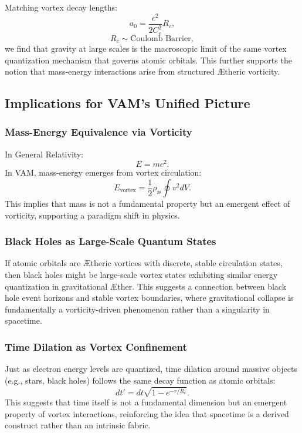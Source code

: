 \documentclass[a4paper,10pt]{article}
\begin{document}
Matching vortex decay lengths:
\begin{equation*}
a_0 = \frac{c^2}{2C_e^2} R_c,
\end{equation*}
\begin{equation*}
R_c \sim \text{Coulomb Barrier},
\end{equation*}
we find that gravity at large scales is the macroscopic limit of the same vortex quantization mechanism that governs atomic orbitals. This further supports the notion that mass-energy interactions arise from structured Ætheric vorticity.


\subsection*{Implications for VAM's Unified Picture}


\subsubsection*{Mass-Energy Equivalence via Vorticity}
In General Relativity:
\begin{equation*}
E = mc^2.
\end{equation*}
In VAM, mass-energy emerges from vortex circulation:
\begin{equation*}
E_\text{vortex} = \frac{1}{2} \rho_\text{\ae} \oint v^2 dV.
\end{equation*}
This implies that mass is not a fundamental property but an emergent effect of vorticity, supporting a paradigm shift in physics.


\subsubsection*{Black Holes as Large-Scale Quantum States}
If atomic orbitals are Ætheric vortices with discrete, stable circulation states, then black holes might be large-scale vortex states exhibiting similar energy quantization in gravitational Æther. This suggests a connection between black hole event horizons and stable vortex boundaries, where gravitational collapse is fundamentally a vorticity-driven phenomenon rather than a singularity in spacetime.


\subsubsection*{Time Dilation as Vortex Confinement}
Just as electron energy levels are quantized, time dilation around massive objects (e.g., stars, black holes) follows the same decay function as atomic orbitals:
\begin{equation*}
dt' = dt \sqrt{1 - e^{-r/R_c}}.
\end{equation*}
This suggests that time itself is not a fundamental dimension but an emergent property of vortex interactions, reinforcing the idea that spacetime is a derived construct rather than an intrinsic fabric.
\end{document}
